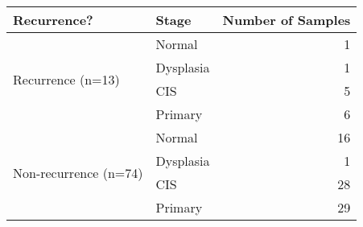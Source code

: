 \begin{tabular}{l|lr}
Recurrence? & Stage & Number of Samples \\ \hline
\multirow{4}{*}{Recurrence (n=13)} & Normal & 1 \\
 & Dysplasia & 1 \\
 & CIS & 5 \\
 & Primary & 6 \\ \hline
\multirow{4}{*}{Non-recurrence (n=74)} & Normal & 16 \\
 & Dysplasia & 1 \\
 & CIS & 28 \\
 & Primary & 29
\end{tabular}
